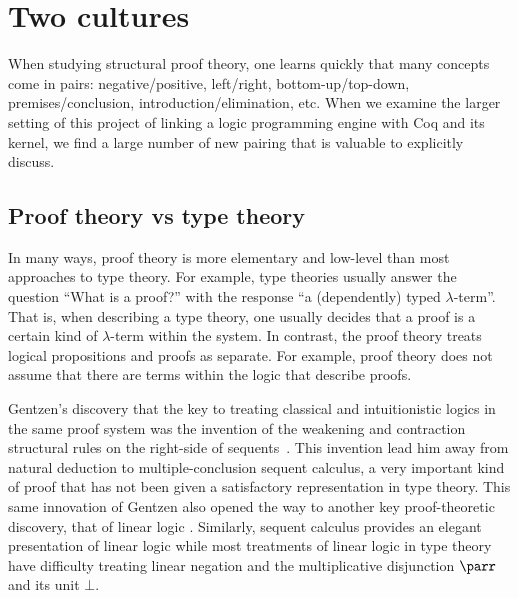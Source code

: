 \section{Two cultures}

When studying structural proof theory, one learns quickly that many
concepts come in pairs: negative/positive, left/right,
bottom-up/top-down, premises/conclusion, introduction/elimination,
etc.  When we examine the larger setting of this project of linking a
logic programming engine with Coq and its kernel, we find a large
number of new pairing that is valuable to explicitly discuss.

\subsection{Proof theory vs type theory}

In many ways, proof theory is more elementary and low-level than most
approaches to type theory.  For example, type theories usually answer
the question ``What is a proof?'' with the response ``a (dependently)
typed $\lambda$-term''.  That is, when describing a type theory, one
usually decides that a proof is a certain kind of $\lambda$-term
within the system.  In contrast, the proof theory treats logical
propositions and proofs as separate.  For example, proof theory does
not assume that there are terms within the logic that describe proofs.



Gentzen's discovery that the key to treating classical and
intuitionistic logics in the same proof system was the invention of
the weakening and contraction structural rules on the right-side of
sequents~\cite{gentzen35}.  This invention lead him away from natural
deduction to multiple-conclusion sequent calculus, a very important
kind of proof that has not been given a satisfactory representation in
type theory.  This same innovation of Gentzen also opened the way to
another key proof-theoretic discovery, that of linear logic
\cite{girard87tcs}.  Similarly, sequent calculus provides an elegant
presentation of linear logic while most treatments of linear logic in
type theory have difficulty treating linear negation and the
multiplicative disjunction $\lpar$ and its unit $\bot$.

